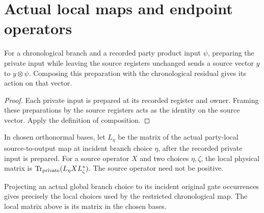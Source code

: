 \section{Actual local maps and endpoint operators}
\label{sec:peps_endpoint_local_operators}

\begin{theorem}
    \label{thm:peps_recorded_private_input}
    \leanok
    For a chronological branch and a recorded party product input $\psi$,
    preparing the private input while leaving the source registers unchanged
    sends a source vector $y$ to $y\otimes\psi$. Composing this preparation
    with the chronological residual gives its action on that vector.
\end{theorem}

\begin{proof}\leanok
    Each private input is prepared at its recorded register and owner.
    Framing these preparations by the source registers acts as the identity
    on the source vector. Apply the definition of composition.
\end{proof}

\begin{definition}
    \label{def:peps_actual_local_branch_matrix}
    \leanok
    In chosen orthonormal bases, let $L_\eta$ be the matrix of the actual
    party-local source-to-output map at incident branch choice $\eta$,
    after the recorded private input is prepared. For a source operator $X$
    and two choices $\eta,\zeta$, the local physical matrix is
    $\operatorname{Tr}_{\rm private}(L_\eta X L_\zeta^*)$.
    The source operator need not be positive.
\end{definition}

\begin{theorem}
    \label{thm:peps_actual_local_branch_matrix}
    \leanok
    Projecting an actual global branch choice to its incident original
    gate occurrences gives precisely the local choices used by the
    restricted chronological map. The local matrix above is its matrix
    in the chosen bases.
\end{theorem}

